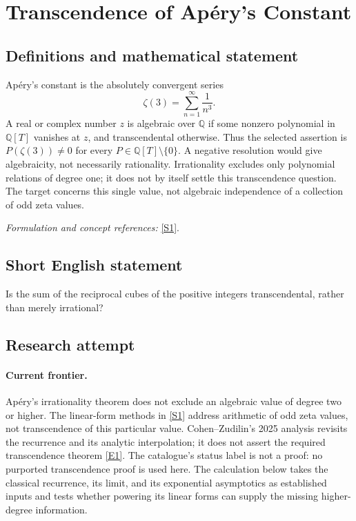 \documentclass[11pt,a4paper]{article}
\newcommand{\Q}{\mathbb{Q}}
\newcommand{\sref}[2]{\hyperlink{source:#1:#2}{[S#2]}}
\newcommand{\eref}[2]{\hyperlink{extra:#1:#2}{[E#2]}}
\newif\ifshowcatalogue
\newcommand{\cataloguescope}[1]{\ifshowcatalogue
 \paragraph{Exact scope in the supplied catalogue.}
 \begin{quote}\small #1\end{quote}\fi}
\numberwithin{equation}{section}
\begin{document}
\setcounter{section}{0}
\clearpage
\section*{\texorpdfstring{Transcendence of Apéry's Constant}{Transcendence of Apéry's Constant}}\label{statement}
\subsection{Definitions and mathematical statement}
Ap\'ery's constant is the absolutely convergent series
\[
 \zeta(3)=\sum_{n=1}^{\infty}\frac1{n^3}.
\]
A real or complex number $z$ is algebraic over $\Q$ if some nonzero polynomial in $\Q[T]$ vanishes at $z$, and transcendental otherwise. Thus the selected assertion is
$P(\zeta(3))\ne0$ for every $P\in\Q[T]\setminus\{0\}$.
A negative resolution would give algebraicity, not necessarily rationality. Irrationality excludes only polynomial relations of degree one; it does not by itself settle this transcendence question. The target concerns this single value, not algebraic independence of a collection of odd zeta values.
\par\smallskip\textit{Formulation and concept references:} \sref{statement}{1}.
\cataloguescope{Prove or disprove that the value zeta(3) is transcendental over the rational numbers.}
\subsection{Short English statement}
Is the sum of the reciprocal cubes of the positive integers transcendental, rather than merely irrational?
\subsection{Research attempt}

\paragraph{Current frontier.}
Ap\'ery's irrationality theorem does not exclude an algebraic value of degree two or higher. The linear-form methods in \sref{statement}{1} address arithmetic of odd zeta values, not transcendence of this particular value. Cohen--Zudilin's 2025 analysis revisits the recurrence and its analytic interpolation; it does not assert the required transcendence theorem \eref{statement}{1}. The catalogue's status label is not a proof: no purported transcendence proof is used here. The calculation below takes the classical recurrence, its limit, and its exponential asymptotics as established inputs and tests whether powering its linear forms can supply the missing higher-degree information.
\end{document}
